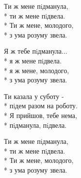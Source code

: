 \begin{minipage}{\linewidth}
\hspace*{1.5em}Ти ж мене пiдманула,\\*
\hspace*{1.5em}ти ж мене пiдвела.\\*
\hspace*{1.5em}Ти ж мене, молодого,\\*
\hspace*{1.5em}з ума розуму звела.\\
\end{minipage}\par\medskip\nobreak

\medskip

\begin{minipage}{\linewidth}
\hspace*{1.5em}Я ж тебе пiдманула...\\*
\hspace*{1.5em}я ж мене пiдвела.\\*
\hspace*{1.5em}я ж мене, молодого,\\*
\hspace*{1.5em}з ума розуму звела.\\
\end{minipage}\par\medskip\nobreak

\medskip

\begin{minipage}{\linewidth}
Ти казала у суботу -\\*
пiдем разом на роботу.\\*
Я прийшов, тебе нема,\\*
пiдманула, пiдвела.\\
\end{minipage}\par\medskip\nobreak

\medskip

\begin{minipage}{\linewidth}
\hspace*{1.5em}Ти ж мене пiдманула,\\*
\hspace*{1.5em}ти ж мене пiдвела.\\*
\hspace*{1.5em}Ти ж мене, молодого,\\*
\hspace*{1.5em}з ума розуму звела.\\
\end{minipage}\par\medskip\nobreak

